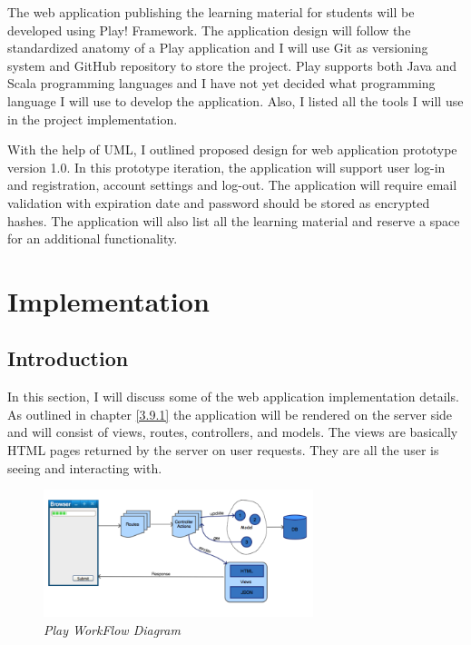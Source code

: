 \documentclass[12pt,twoside,a4paper]{report}
\begin{document}
The web application publishing the learning material for students will be developed using Play! Framework. The application design will follow the standardized anatomy of a Play application and I will use Git as versioning system and GitHub repository to store the project. Play supports both Java and Scala programming languages and I have not yet decided what programming language I will use to develop the application. Also, I listed all the tools I will use in the project implementation.

With the help of UML, I outlined proposed design for web application prototype version 1.0. In this prototype iteration, the application will support user log-in and registration, account settings and log-out. The application will require email validation with expiration date and password should be stored as encrypted hashes. The application will also list all the learning material and reserve a space for an additional functionality.










\chapter{Implementation}\label{4}

\section{Introduction}\label{4.1}
In this section, I will discuss some of the web application implementation details. As outlined in chapter \ref{3.9.1} the application will be rendered on the server side and will consist of views, routes, controllers, and models. The views are basically HTML pages returned by the server on user requests. They are all the user is seeing and interacting with.

\begin{figure}[!ht]
	\centering
		\includegraphics[width=0.7\textwidth, totalheight=5.8cm]
		{play_workflow_diagram}
	\caption{\textit{Play WorkFlow Diagram}}
	\label{f4.1}
\end{figure}
\end{document}
